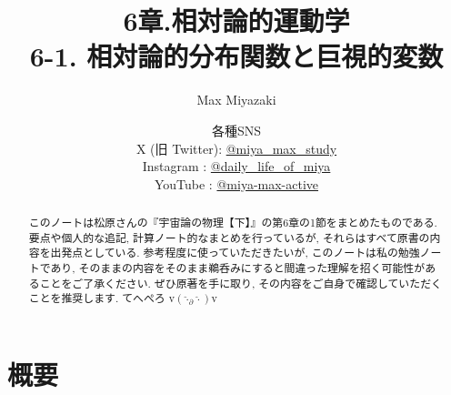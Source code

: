 \documentclass[a4paper,12pt]{article}
\title{6章.相対論的運動学\\
6-1. 相対論的分布関数と巨視的変数}
\date{各種SNS\\
    X (旧 Twitter): \href{https://x.com/miya_max_study}{@miya\_max\_study}\\
    Instagram : \href{https://www.instagram.com/daily_life_of_miya/}{@daily\_life\_of\_miya}\\
    YouTube : \href{https://www.youtube.com/@miya-max-active}{@miya-max-active}
    }
\author{Max Miyazaki}
\begin{document}
\maketitle

\vspace{1cm}
\begin{abstract}
    このノートは松原さんの『宇宙論の物理【下】』の第6章の1節をまとめたものである. 要点や個人的な追記, 計算ノート的なまとめを行っているが, それらはすべて原書の内容を出発点としている. 参考程度に使っていただきたいが, このノートは私の勉強ノートであり, そのままの内容をそのまま鵜呑みにすると間違った理解を招く可能性があることをご了承ください. ぜひ原著を手に取り, その内容をご自身で確認していただくことを推奨します. てへぺろ v$({\hat{\cdot}_\partial \hat{\cdot}})$v
\end{abstract}
    
    

\newpage
\color{blue}
\section*{概要}
\end{document}
